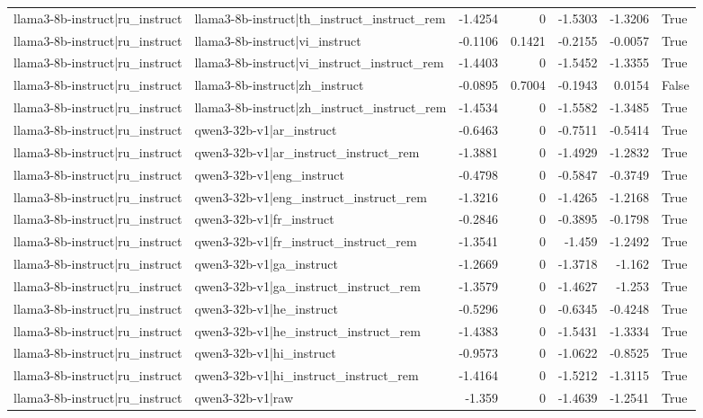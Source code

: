 \begin{table}
\begin{tabular}{l l r r r r l}
llama3-8b-instruct|ru_instruct & llama3-8b-instruct|th_instruct_instruct_rem & -1.4254 & 0 & -1.5303 & -1.3206 & True \\
llama3-8b-instruct|ru_instruct & llama3-8b-instruct|vi_instruct & -0.1106 & 0.1421 & -0.2155 & -0.0057 & True \\
llama3-8b-instruct|ru_instruct & llama3-8b-instruct|vi_instruct_instruct_rem & -1.4403 & 0 & -1.5452 & -1.3355 & True \\
llama3-8b-instruct|ru_instruct & llama3-8b-instruct|zh_instruct & -0.0895 & 0.7004 & -0.1943 & 0.0154 & False \\
llama3-8b-instruct|ru_instruct & llama3-8b-instruct|zh_instruct_instruct_rem & -1.4534 & 0 & -1.5582 & -1.3485 & True \\
llama3-8b-instruct|ru_instruct & qwen3-32b-v1|ar_instruct & -0.6463 & 0 & -0.7511 & -0.5414 & True \\
llama3-8b-instruct|ru_instruct & qwen3-32b-v1|ar_instruct_instruct_rem & -1.3881 & 0 & -1.4929 & -1.2832 & True \\
llama3-8b-instruct|ru_instruct & qwen3-32b-v1|eng_instruct & -0.4798 & 0 & -0.5847 & -0.3749 & True \\
llama3-8b-instruct|ru_instruct & qwen3-32b-v1|eng_instruct_instruct_rem & -1.3216 & 0 & -1.4265 & -1.2168 & True \\
llama3-8b-instruct|ru_instruct & qwen3-32b-v1|fr_instruct & -0.2846 & 0 & -0.3895 & -0.1798 & True \\
llama3-8b-instruct|ru_instruct & qwen3-32b-v1|fr_instruct_instruct_rem & -1.3541 & 0 & -1.459 & -1.2492 & True \\
llama3-8b-instruct|ru_instruct & qwen3-32b-v1|ga_instruct & -1.2669 & 0 & -1.3718 & -1.162 & True \\
llama3-8b-instruct|ru_instruct & qwen3-32b-v1|ga_instruct_instruct_rem & -1.3579 & 0 & -1.4627 & -1.253 & True \\
llama3-8b-instruct|ru_instruct & qwen3-32b-v1|he_instruct & -0.5296 & 0 & -0.6345 & -0.4248 & True \\
llama3-8b-instruct|ru_instruct & qwen3-32b-v1|he_instruct_instruct_rem & -1.4383 & 0 & -1.5431 & -1.3334 & True \\
llama3-8b-instruct|ru_instruct & qwen3-32b-v1|hi_instruct & -0.9573 & 0 & -1.0622 & -0.8525 & True \\
llama3-8b-instruct|ru_instruct & qwen3-32b-v1|hi_instruct_instruct_rem & -1.4164 & 0 & -1.5212 & -1.3115 & True \\
llama3-8b-instruct|ru_instruct & qwen3-32b-v1|raw & -1.359 & 0 & -1.4639 & -1.2541 & True \\

\end{tabular}
\end{table}
